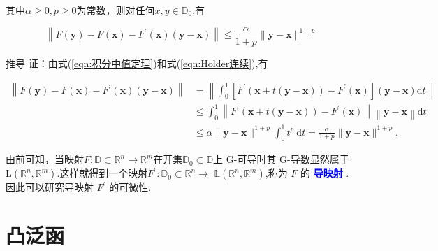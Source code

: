 \documentclass{lzureport}
\begin{document}
其中$\alpha\geqslant0,p\geqslant0$为常数，则对任何$x,y\in\mathbb{D}_0$,有

$$\left\|F(\mathbf{y})-F(\mathbf{x})-F^{\prime}(\mathbf{x})(\mathbf{y}-\mathbf{x})\right\|\leqslant\frac{\alpha}{1+p}\|\mathbf{y}-\mathbf{x}\|^{1+p}$$

\begin{derivation}{推导}
	证：由式(\ref{eqn:积分中值定理})和式(\ref{eqn:Holder连续}),有
	
	$$\begin{aligned}\left\|F(\mathbf{y})-F(\mathbf{x})-F^{\prime}(\mathbf{x})(\mathbf{y}-\mathbf{x})\right\|&=\left\|\int_0^1\left[F^{\prime}(\boldsymbol{x}+t(\boldsymbol{y}-\boldsymbol{x}))-F^{\prime}(\boldsymbol{x})\right](\boldsymbol{y}-\boldsymbol{x})\mathrm{d}t\right\|\\&\leqslant\int_0^1\left\|F^{\prime}(\boldsymbol{x}+t(\boldsymbol{y}-\boldsymbol{x}))-F^{\prime}(\boldsymbol{x})\right\|\left\|\boldsymbol{y}-\boldsymbol{x}\right\|\mathrm{d}t\\&\leqslant\alpha\|\mathbf{y}-\boldsymbol{x}\|^{1+p}\int_0^1t^p\:\mathrm{d}t=\frac\alpha{1+p}\|\mathbf{y}-\boldsymbol{x}\|^{1+p}.\end{aligned}$$
	
	由前可知，当映射$F:\mathbb{D}\subset\mathbb{R}^n\to\mathbb{R}^m$在开集$\mathbb{D}_0\subset\mathbb{D}$上 G-可导时其 G-导数显然属于 L$(\mathbb{R}^n,\mathbb{R}^m).$这样就得到一个映射$F^\prime:\mathbb{D}_0\subset\mathbb{R}^n\to$ $\mathbb{L}\left(\mathbb{R}^n,\mathbb{R}^m\right)$,称为 $F$ 的 \textcolor{blue}{\textbf{导映射}} .因此可以研究导映射 $F^\prime$ 的可微性.	
\end{derivation}

\section{凸泛函}

	
\end{document}
